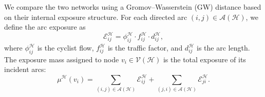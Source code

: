 \documentclass[lettersize,journal]{IEEEtran}
\begin{document}
We compare the two networks using a Gromov--Wasserstein (GW) distance based on
their internal exposure structure. For each directed arc $(i,j)\in\mathcal{A}(\mathcal{H})$,
we define the arc exposure as
\begin{equation}
    \mathcal{E}^{\mathcal{H}}_{ij}
    =
    \phi^{\mathcal{H}}_{ij} \cdot
    f^{\mathcal{H}}_{ij} \cdot
    d^{\mathcal{H}}_{ij},
\end{equation}
where $\phi^{\mathcal{H}}_{ij}$ is the cyclist flow, $f^{\mathcal{H}}_{ij}$ is the traffic
factor, and $d^{\mathcal{H}}_{ij}$ is the arc length. The exposure mass assigned to
node $v_i\in\mathcal{V}(\mathcal{H})$ is the total exposure of its incident arcs:
\begin{equation}
    \mu^{\mathcal{H}}(v_i)
    =
    \sum_{(i,j)\in\mathcal{A}(\mathcal{H})}
    \mathcal{E}^{\mathcal{H}}_{ij}
    +
    \sum_{(j,i)\in\mathcal{A}(\mathcal{H})}
    \mathcal{E}^{\mathcal{H}}_{ji}.
\end{equation}
\end{document}
